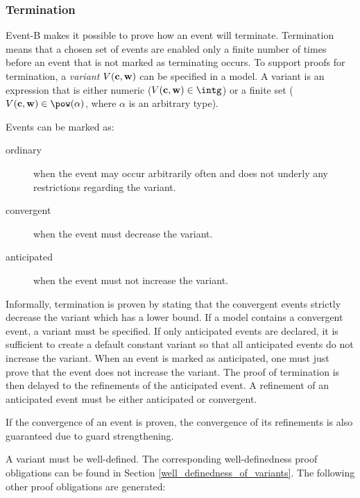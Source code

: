 \subsubsection{Termination}
\label{termination}
Event-B makes it possible to prove how an event will terminate.
Termination means that a chosen set of events are enabled only a finite number
 of times before an event that is not marked as terminating occurs.
To support proofs for termination, a \emph{variant} $V(\mathbf{c},\mathbf{w})$ can be specified in a model.
A variant is an expression that is either numeric 
 ($V(\allconstants,\concvariables)\in\intg$) or
 a finite set ($V(\allconstants,\concvariables)\in\pow(\alpha)$,
 where $\alpha$ is an arbitrary type).

Events can be marked as:
\begin{description}
\item[ordinary] when the event may occur arbitrarily often and does not underly any restrictions
  regarding the variant.
\item[convergent] when the event must decrease the variant.
\item[anticipated] when the event must not increase the variant.
\end{description}
Informally, termination is proven by stating that the convergent events strictly decrease the variant
  which has a lower bound.
If a model contains a convergent event, a variant must be specified.
If only anticipated events are declared, it is sufficient to create a default constant variant so
  that all anticipated events do not increase the variant.
When an event is marked as anticipated, one must just prove that the event does not increase the
  variant.
The proof of termination is then delayed to the refinements of the anticipated event.
A refinement of an anticipated event must be either anticipated or convergent.

If the convergence of an event is proven, the convergence of its refinements is also guaranteed due to guard strengthening.

A variant must be well-defined. The corresponding well-definedness proof obligations
  can be found in Section \ref{well_definedness_of_variants}.
The following other proof obligations are generated:


